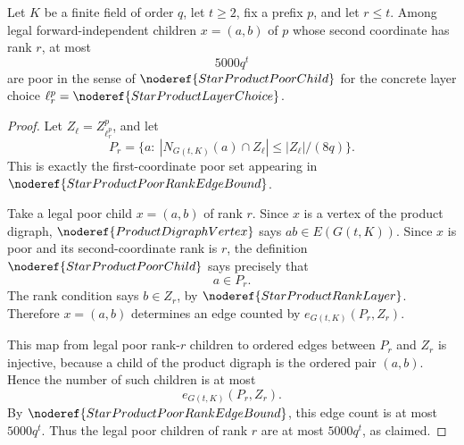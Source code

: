 \begin{helper}
Let \(K\) be a finite field of order \(q\), let \(t\ge2\), fix a prefix
\(p\), and let \(r\le t\).  Among legal forward-independent children
\(x=(a,b)\) of \(p\) whose second coordinate has rank \(r\), at most
\[
  5000q^t
\]
are poor in the sense of \(\noderef{StarProductPoorChild}\) for the
concrete layer choice \(\ell^p_r=\noderef{StarProductLayerChoice}\).
\end{helper}
\begin{proof}
Let \(Z_\ell=Z^p_{\ell^p_r}\), and let
\[
  P_r=\{a:\ |N_{G(t,K)}(a)\cap Z_\ell|\le |Z_\ell|/(8q)\}.
\]
This is exactly the first-coordinate poor set appearing in
\(\noderef{StarProductPoorRankEdgeBound}\).

Take a legal poor child \(x=(a,b)\) of rank \(r\).  Since \(x\) is a vertex
of the product digraph, \(\noderef{ProductDigraphVertex}\) says
\(ab\in E(G(t,K))\).  Since \(x\) is poor and its second-coordinate rank is
\(r\), the definition \(\noderef{StarProductPoorChild}\) says precisely that
\[
  a\in P_r.
\]
The rank condition says \(b\in Z_r\), by
\(\noderef{StarProductRankLayer}\).  Therefore \(x=(a,b)\) determines an
edge counted by \(e_{G(t,K)}(P_r,Z_r)\).

This map from legal poor rank-\(r\) children to ordered edges between
\(P_r\) and \(Z_r\) is injective, because a child of the product digraph is
the ordered pair \((a,b)\).  Hence the number of such children is at most
\[
  e_{G(t,K)}(P_r,Z_r).
\]
By \(\noderef{StarProductPoorRankEdgeBound}\), this edge count is at most
\(5000q^t\).  Thus the legal poor children of rank \(r\) are at most
\(5000q^t\), as claimed.
\end{proof}
